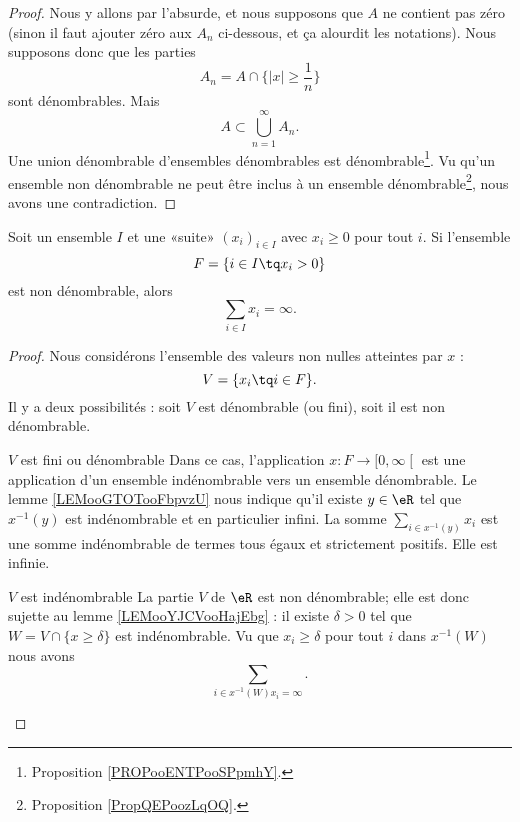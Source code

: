 \begin{proof}
    Nous y allons par l'absurde, et nous supposons que \( A\) ne contient pas zéro (sinon il faut ajouter zéro aux \( A_n\) ci-dessous, et ça alourdit les notations). Nous supposons donc que les parties
    \begin{equation}
        A_n=A\cap\{ | x |\geq \frac{1}{ n } \}
    \end{equation}
    sont dénombrables. Mais
    \begin{equation}
        A\subset \bigcup_{n=1}^{\infty}A_n.
    \end{equation}
    Une union dénombrable d'ensembles dénombrables est dénombrable\footnote{Proposition \ref{PROPooENTPooSPpmhY}.}. Vu qu'un ensemble non dénombrable ne peut être inclus à un ensemble dénombrable\footnote{Proposition \ref{PropQEPoozLqOQ}.}, nous avons une contradiction.
\end{proof}

\begin{lemma}
    Soit un ensemble \( I\) et une «suite» \( (x_i)_{i\in I}\) avec \( x_i\geq 0\) pour tout \( i\). Si l'ensemble
    \begin{equation}
        F=\{ i\in I\tq x_i>0 \}
    \end{equation}
    est non dénombrable, alors
    \begin{equation}
        \sum_{i\in I}x_i=\infty.
    \end{equation}
\end{lemma}

\begin{proof}
    Nous considérons l'ensemble des valeurs non nulles atteintes par \( x\) :
    \begin{equation}
        V=\{ x_i\tq i\in F \}.
    \end{equation}
    Il y a deux possibilités : soit \( V\) est dénombrable (ou fini), soit il est non dénombrable.

    \begin{subproof}
        \item[\( V\) est fini ou dénombrable]
            Dans ce cas, l'application \( x\colon F\to \mathopen[ 0 , \infty \mathclose[\) est une application d'un ensemble indénombrable vers un ensemble dénombrable. Le lemme \ref{LEMooGTOTooFbpvzU} nous indique qu'il existe \( y\in \eR\) tel que \( x^{-1}(y)\) est indénombrable et en particulier infini. La somme \( \sum_{i\in x^{-1}(y)}x_i\) est une somme indénombrable de termes tous égaux et strictement positifs. Elle est infinie.

            \item[\( V\) est indénombrable]
                La partie \( V\) de \( \eR\) est non dénombrable; elle est donc sujette au lemme \ref{LEMooYJCVooHajEbg} : il existe \( \delta>0\) tel que \( W=V\cap\{ x\geq \delta \}\) est indénombrable. Vu que \( x_i\geq \delta\) pour tout \( i\) dans \( x^{-1}(W)\) nous avons
                \begin{equation}
                    \sum_{i\in x^{-1}(W)x_i=\infty}.
                \end{equation}
    \end{subproof}
\end{proof}

